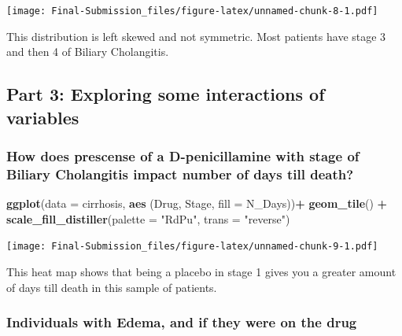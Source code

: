 \documentclass[
]{article}
\newenvironment{Shaded}{\begin{snugshade}}{\end{snugshade}}
\newcommand{\AttributeTok}[1]{\textcolor[rgb]{0.13,0.29,0.53}{#1}}
\newcommand{\FunctionTok}[1]{\textcolor[rgb]{0.13,0.29,0.53}{\textbf{#1}}}
\newcommand{\NormalTok}[1]{#1}
\newcommand{\SpecialCharTok}[1]{\textcolor[rgb]{0.81,0.36,0.00}{\textbf{#1}}}
\newcommand{\StringTok}[1]{\textcolor[rgb]{0.31,0.60,0.02}{#1}}
\begin{document}
\texttt{[image: Final-Submission\_files/figure-latex/unnamed-chunk-8-1.pdf]}

This distribution is left skewed and not symmetric. Most patients have
stage 3 and then 4 of Biliary Cholangitis.

\hypertarget{part-3-exploring-some-interactions-of-variables}{%
\subsection{Part 3: Exploring some interactions of
variables}\label{part-3-exploring-some-interactions-of-variables}}

\hypertarget{how-does-prescense-of-a-d-penicillamine-with-stage-of-biliary-cholangitis-impact-number-of-days-till-death}{%
\subsubsection{How does prescense of a D-penicillamine with stage of
Biliary Cholangitis impact number of days till
death?}\label{how-does-prescense-of-a-d-penicillamine-with-stage-of-biliary-cholangitis-impact-number-of-days-till-death}}

\begin{Shaded}
\begin{Highlighting}[]
\FunctionTok{ggplot}\NormalTok{(}\AttributeTok{data =}\NormalTok{ cirrhosis, }\FunctionTok{aes}\NormalTok{ (Drug, Stage, }\AttributeTok{fill =}\NormalTok{ N\_Days))}\SpecialCharTok{+} \FunctionTok{geom\_tile}\NormalTok{() }\SpecialCharTok{+} \FunctionTok{scale\_fill\_distiller}\NormalTok{(}\AttributeTok{palette =} \StringTok{"RdPu"}\NormalTok{, }\AttributeTok{trans =} \StringTok{"reverse"}\NormalTok{) }
\end{Highlighting}
\end{Shaded}

\texttt{[image: Final-Submission\_files/figure-latex/unnamed-chunk-9-1.pdf]}

This heat map shows that being a placebo in stage 1 gives you a greater
amount of days till death in this sample of patients.

\hypertarget{individuals-with-edema-and-if-they-were-on-the-drug}{%
\subsubsection{Individuals with Edema, and if they were on the
drug}\label{individuals-with-edema-and-if-they-were-on-the-drug}}
\end{document}
